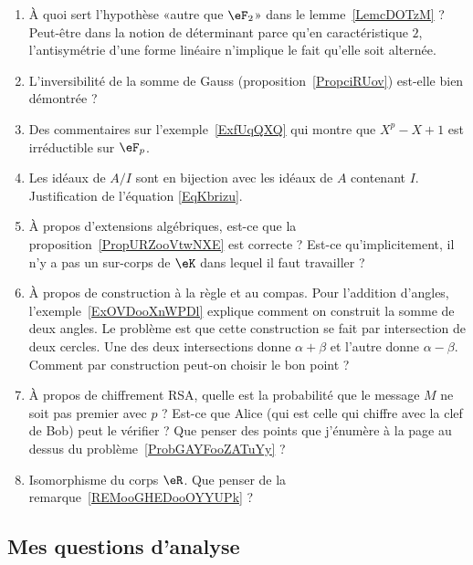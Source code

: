 \begin{enumerate}
    \item
        À quoi sert l'hypothèse «autre que \( \eF_2\)» dans le lemme~\ref{LemcDOTzM} ? Peut-être dans la notion de déterminant parce qu'en caractéristique \( 2\), l'antisymétrie d'une forme linéaire n'implique le fait qu'elle soit alternée.
    \item
        L'inversibilité de la somme de Gauss (proposition~\ref{PropciRUov}) est-elle bien démontrée ?
    \item
        Des commentaires sur l'exemple~\ref{ExfUqQXQ} qui montre que \( X^p-X+1\) est irréductible sur \( \eF_p\).
    \item
        Les idéaux de \( A/I\) sont en bijection avec les idéaux de \( A\) contenant \( I\). Justification de l'équation \eqref{EqKbrizu}.
    \item
        À propos d'extensions algébriques, est-ce que la proposition~\ref{PropURZooVtwNXE} est correcte ? Est-ce qu'implicitement, il n'y a pas un sur-corps de \( \eK\) dans lequel il faut travailler ?
    \item
        À propos de construction à la règle et au compas. Pour l'addition d'angles, l'exemple~\ref{ExOVDooXnWPDl} explique comment on construit la somme de deux angles. Le problème est que cette construction se fait par intersection de deux cercles. Une des deux intersections donne \( \alpha+\beta\) et l'autre donne \( \alpha-\beta\). Comment par construction peut-on choisir le bon point ?
    \item
        À propos de chiffrement RSA, quelle est la probabilité que le message \( M\) ne soit pas premier avec \( p\) ? Est-ce que Alice (qui est celle qui chiffre avec la clef de Bob) peut le vérifier ? Que penser des points que j'énumère à la page \pageref{PageAKTBooMDeQxY} au dessus du problème~\ref{ProbGAYFooZATuYy} ?
    \item
        Isomorphisme du corps \( \eR\). Que penser de la remarque~\ref{REMooGHEDooOYYUPk} ?
\end{enumerate}

\subsection{Mes questions d'analyse}

